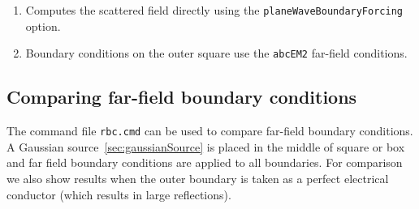 \documentclass{article}
\begin{document}
\begin{enumerate}
  \item Computes the scattered field directly using the {\tt planeWaveBoundaryForcing} option.
  \item Boundary conditions on the outer square use the {\tt abcEM2} far-field conditions.
\end{enumerate}


\clearpage
\subsection{Comparing far-field boundary conditions} \label{sec:compareFarField}

The command file {\tt rbc.cmd} can be used to compare far-field boundary conditions.
A Gaussian source~\ref{sec:gaussianSource} is placed in the middle of square or box and far field boundary 
conditions are applied to all boundaries. For comparison we also show results when the outer boundary
is taken as a perfect electrical conductor (which results in large reflections).
\end{document}
